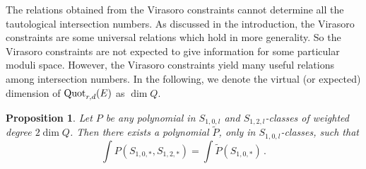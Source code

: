 \documentclass[11pt]{amsart}
\newtheorem{proposition}[theorem]{Proposition}
\theoremstyle{remark}
\newcommand{\wt}[1]{\widetilde{#1}}
\newcommand{\quot}[0]{\textnormal{Quot}}
\numberwithin{theorem}{section}
\begin{document}
The relations obtained from the Virasoro constraints cannot determine all the tautological intersection numbers.
As discussed in the introduction, 
the Virasoro constraints are some universal relations which hold in more generality.
So the Virasoro constraints are not expected to give 
information for some particular moduli space.
However, the Virasoro constraints yield many useful relations among intersection numbers.
In the following, we denote the virtual (or expected)
dimension of $\quot_{r,d}(E)$ as $\dim Q$.
\begin{proposition}\label{proposition intersection of S_12 classes from S_10 classes}
    Let $P$ be any polynomial in $S_{1,0,l}$ and $S_{1,2,l}$-classes of weighted degree $2\dim Q$.
    Then there exists a polynomial $\wt P$, only in $S_{1,0,l}$-classes, such that 
    $$ \int P(S_{1,0,*},S_{1,2,*}) = \int \wt P (S_{1,0,*})\,.$$
\end{proposition}
\end{document}
